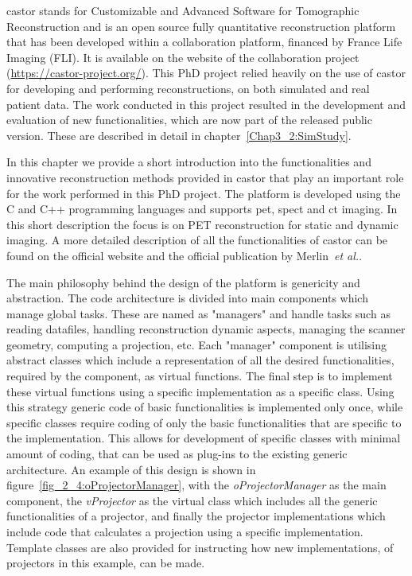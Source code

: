 \Gls{castor} stands for Customizable and Advanced Software for Tomographic Reconstruction and is an open source fully quantitative reconstruction platform that has been developed within a collaboration platform, financed by France Life Imaging (FLI). It is available on the website of the collaboration project {(\url{https://castor-project.org/})}.
This PhD project relied heavily on the use of \gls{castor} for developing and performing reconstructions, on both simulated and real patient data. The work conducted in this project resulted in the development and evaluation of new functionalities, which are now part of the released public version. These are described in detail in chapter~\ref{Chap3_2:SimStudy}. 

In this chapter we provide a short introduction into the functionalities and innovative reconstruction methods provided in \gls{castor} that play an important role for the work performed in this PhD project. 
The platform is developed using the C and C++ programming languages and supports \gls{pet}, \gls{spect} and \gls{ct} imaging. 
In this short description the focus is on PET reconstruction for static and dynamic imaging. A more detailed description of all the functionalities of \gls{castor} can be found on the official website and the official publication by Merlin~\textit{et al.}\cite{Merlin2018}. 

The main philosophy behind the design of the platform is genericity and abstraction. The code architecture is divided into main components which manage global tasks. These are named as "managers" and handle tasks such as reading datafiles, handling reconstruction dynamic aspects, managing the scanner geometry, computing a projection, etc. 
Each "manager" component is utilising abstract classes which include a representation of all the desired functionalities, required by the component, as virtual functions. The final step is to implement these virtual functions using a specific implementation as a specific class. 
Using this strategy generic code of basic functionalities is implemented only once, while specific classes require coding of only the basic functionalities that are specific to the implementation. This allows for development of specific classes with minimal amount of coding, that can be used as plug-ins to the existing generic architecture. 
An example of this design is shown in figure~\ref{fig_2_4:oProjectorManager}, with the \textit{oProjectorManager} as the main component, the \textit{vProjector} as the virtual class which includes all the generic functionalities of a projector, and finally the projector implementations which include code that calculates a projection using a specific implementation. Template classes are also provided for instructing how new implementations, of projectors in this example, can be made. 

